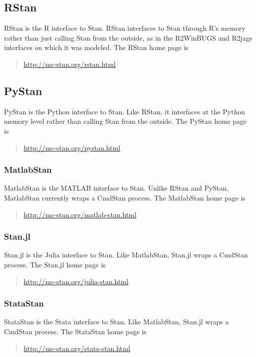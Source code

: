 \subsection{RStan}

RStan is the R interface to Stan.  RStan interfaces to Stan through
R's memory rather than just calling Stan from the outside, as in the
R2WinBUGS and R2jags interfaces on which it was modeled.  The RStan
home page is
%
\begin{quote}
\url{http://mc-stan.org/rstan.html}
\end{quote}

\subsection{PyStan}

PyStan is the Python interface to Stan.  Like RStan, it interfaces at
the Python memory level rather than calling Stan from the outside.
The PyStan home page is
%
\begin{quote}
\url{http://mc-stan.org/pystan.html}
\end{quote}

\subsubsection{MatlabStan}

MatlabStan is the MATLAB interface to Stan.  Unlike RStan and PyStan,
MatlabStan currently wraps a CmdStan process.  The
MatlabStan home page is
%
\begin{quote}
\url{http://mc-stan.org/matlab-stan.html}
\end{quote}
%

\subsubsection{Stan.jl}

Stan.jl is the Julia interface to Stan.  Like MatlabStan, Stan.jl
wraps a CmdStan process.  The Stan.jl home page is
%
\begin{quote}
\url{http://mc-stan.org/julia-stan.html}
\end{quote}
%

\subsubsection{StataStan}

StataStan is the Stata interface to Stan.  Like MatlabStan, Stan.jl
wraps a CmdStan process.  The StataStan home page is
%
\begin{quote}
\url{http://mc-stan.org/stata-stan.html}
\end{quote}

